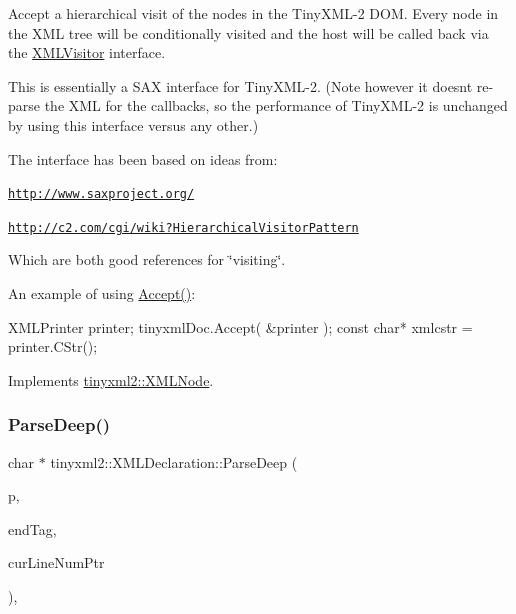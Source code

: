Accept a hierarchical visit of the nodes in the Tiny\+X\+M\+L-\/2 D\+OM. Every node in the X\+ML tree will be conditionally visited and the host will be called back via the \hyperlink{classtinyxml2_1_1_x_m_l_visitor}{X\+M\+L\+Visitor} interface.

This is essentially a S\+AX interface for Tiny\+X\+M\+L-\/2. (Note however it doesn\textquotesingle{}t re-\/parse the X\+ML for the callbacks, so the performance of Tiny\+X\+M\+L-\/2 is unchanged by using this interface versus any other.)

The interface has been based on ideas from\+:


\begin{DoxyItemize}
\item \href{http://www.saxproject.org/}{\tt http\+://www.\+saxproject.\+org/}
\item \href{http://c2.com/cgi/wiki?HierarchicalVisitorPattern}{\tt http\+://c2.\+com/cgi/wiki?\+Hierarchical\+Visitor\+Pattern}
\end{DoxyItemize}

Which are both good references for \char`\"{}visiting\char`\"{}.

An example of using \hyperlink{classtinyxml2_1_1_x_m_l_declaration_acf47629d9fc08ed6f1c164a97bcf794b}{Accept()}\+: \begin{DoxyVerb}XMLPrinter printer;
tinyxmlDoc.Accept( &printer );
const char* xmlcstr = printer.CStr();
\end{DoxyVerb}
 

Implements \hyperlink{classtinyxml2_1_1_x_m_l_node_a81e66df0a44c67a7af17f3b77a152785}{tinyxml2\+::\+X\+M\+L\+Node}.

\mbox{\label{classtinyxml2_1_1_x_m_l_declaration_a9a74a7d55c045d2d183878aaca0082dc}} 
\subsubsection{\texorpdfstring{Parse\+Deep()}{ParseDeep()}}
{\footnotesize\ttfamily char $\ast$ tinyxml2\+::\+X\+M\+L\+Declaration\+::\+Parse\+Deep (\begin{DoxyParamCaption}\item[{char $\ast$}]{p,  }\item[{\hyperlink{classtinyxml2_1_1_str_pair}{Str\+Pair} $\ast$}]{end\+Tag,  }\item[{int $\ast$}]{cur\+Line\+Num\+Ptr }\end{DoxyParamCaption})\hspace{0.3cm}{\ttfamily [protected]}, {\ttfamily [virtual]}}



